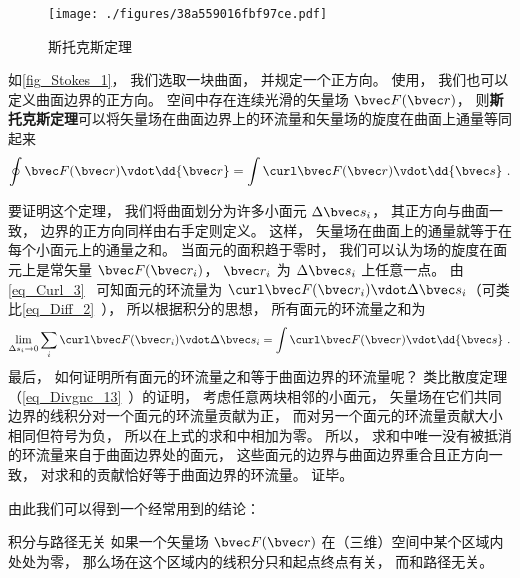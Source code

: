 
\begin{issues}
\issueTODO
\end{issues}


\begin{figure}[ht]
\centering
\texttt{[image: ./figures/38a559016fbf97ce.pdf]}
\caption{斯托克斯定理} \label{fig_Stokes_1}
\end{figure}

如\autoref{fig_Stokes_1}， 我们选取一块曲面， 并规定一个正方向。 使用， 我们也可以定义曲面边界的正方向。 空间中存在连续光滑的矢量场 $\bvec F(\bvec r)$， 则\textbf{斯托克斯定理}可以将矢量场在曲面边界上的环流量和矢量场的旋度在曲面上通量等同起来
\begin{equation}\label{eq_Stokes_1}
\oint \bvec F(\bvec r) \vdot \dd{\bvec r} = \int \curl \bvec F(\bvec r) \vdot \dd{\bvec s}~.
\end{equation}

要证明这个定理， 我们将曲面划分为许多小面元 $\Delta \bvec s_i$， 其正方向与曲面一致， 边界的正方向同样由右手定则定义。 这样， 矢量场在曲面上的通量就等于在每个小面元上的通量之和。 当面元的面积趋于零时， 我们可以认为场的旋度在面元上是常矢量 $\bvec F(\bvec r_i)$， $\bvec r_i$ 为 $\Delta \bvec s_i$ 上任意一点。 由\autoref{eq_Curl_3}~ 可知面元的环流量为 $\curl\bvec F(\bvec r_i) \vdot \Delta \bvec s_i$（可类比\autoref{eq_Diff_2}~）， 所以根据积分的思想， 所有面元的环流量之和为
\begin{equation}
\lim_{\Delta s_i \to 0}\sum_i \curl\bvec F(\bvec r_i) \vdot \Delta \bvec s_i = \int \curl\bvec F(\bvec r) \vdot \dd{\bvec s}~.
\end{equation}
最后， 如何证明所有面元的环流量之和等于曲面边界的环流量呢？ 类比散度定理（\autoref{eq_Divgnc_13}~）的证明， 考虑任意两块相邻的小面元， 矢量场在它们共同边界的线积分对一个面元的环流量贡献为正， 而对另一个面元的环流量贡献大小相同但符号为负， 所以在上式的求和中相加为零。 所以， 求和中唯一没有被抵消的环流量来自于曲面边界处的面元， 这些面元的边界与曲面边界重合且正方向一致， 对求和的贡献恰好等于曲面边界的环流量。 证毕。

由此我们可以得到一个经常用到的结论：
\begin{theorem}{积分与路径无关}
如果一个矢量场 $\bvec F(\bvec r)$ 在（三维）空间中某个区域内处处为零， 那么场在这个区域内的线积分只和起点终点有关， 而和路径无关。
\end{theorem}

